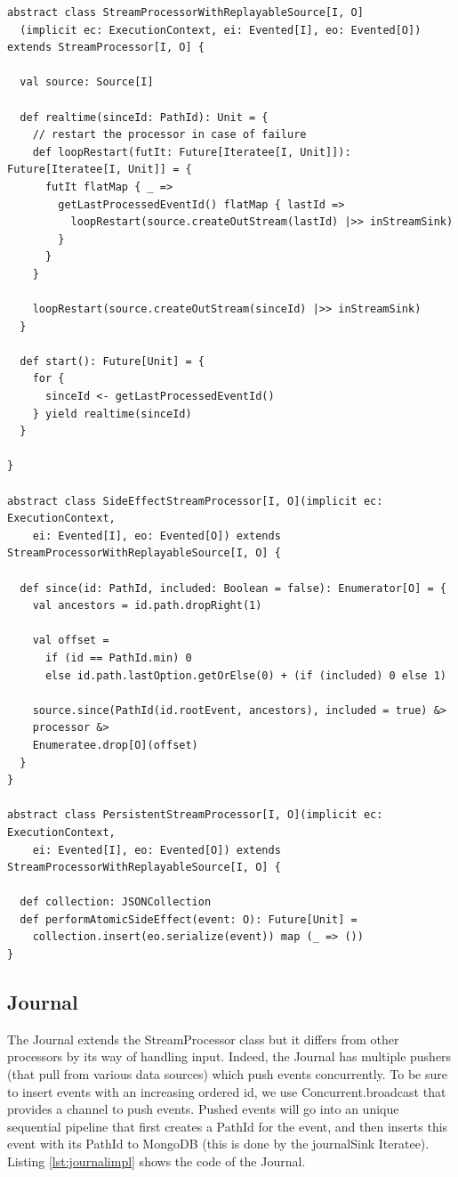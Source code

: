 \begin{verbatim}
abstract class StreamProcessorWithReplayableSource[I, O]
  (implicit ec: ExecutionContext, ei: Evented[I], eo: Evented[O]) extends StreamProcessor[I, O] {

  val source: Source[I]

  def realtime(sinceId: PathId): Unit = {
    // restart the processor in case of failure
    def loopRestart(futIt: Future[Iteratee[I, Unit]]): Future[Iteratee[I, Unit]] = {
      futIt flatMap { _ =>
        getLastProcessedEventId() flatMap { lastId =>
          loopRestart(source.createOutStream(lastId) |>> inStreamSink)
        }
      }
    }

    loopRestart(source.createOutStream(sinceId) |>> inStreamSink)
  }

  def start(): Future[Unit] = {
    for {
      sinceId <- getLastProcessedEventId()
    } yield realtime(sinceId)
  }

}

abstract class SideEffectStreamProcessor[I, O](implicit ec: ExecutionContext,
    ei: Evented[I], eo: Evented[O]) extends StreamProcessorWithReplayableSource[I, O] {

  def since(id: PathId, included: Boolean = false): Enumerator[O] = {
    val ancestors = id.path.dropRight(1)

    val offset =
      if (id == PathId.min) 0
      else id.path.lastOption.getOrElse(0) + (if (included) 0 else 1)

    source.since(PathId(id.rootEvent, ancestors), included = true) &>
    processor &>
    Enumeratee.drop[O](offset)
  }
}

abstract class PersistentStreamProcessor[I, O](implicit ec: ExecutionContext, 
    ei: Evented[I], eo: Evented[O]) extends StreamProcessorWithReplayableSource[I, O] {

  def collection: JSONCollection
  def performAtomicSideEffect(event: O): Future[Unit] = 
    collection.insert(eo.serialize(event)) map (_ => ())
}
\end{verbatim}


\subsection{Journal}

The Journal extends the StreamProcessor class but it differs from other processors by its way of handling input. Indeed, the Journal has multiple pushers (that pull from various data sources) which push events concurrently. To be sure to insert events with an increasing ordered id, we use Concurrent.broadcast that provides a channel to push events. Pushed events will go into an unique sequential pipeline that first creates a PathId for the event, and then inserts this event with its PathId to MongoDB (this is done by the journalSink Iteratee). Listing \ref{lst:journalimpl} shows the code of the Journal.

